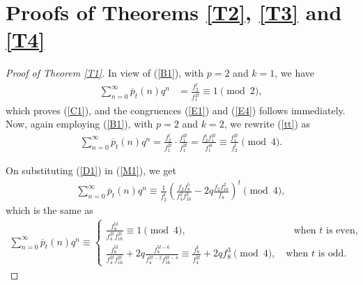 \documentclass[12pt,reqno,a4paper]{amsart}
\numberwithin{equation}{section}
\begin{document}
\section{Proofs of Theorems \ref{T2}, \ref{T3} and \ref{T4}}
\begin{proof}[Proof of Theorem \ref{T1}]
In view of (\ref{B1}), with $p=2$ and $k=1$, we have
    \begin{align*}
    \sum_{n=0}^\infty\overline{p}_{t}(n)q^n&=\frac{f_2^t}{f_1^{2t}}\equiv 1\pmod{2},
    \end{align*}
    which proves (\ref{C1}), and the congruences (\ref{E1}) and  (\ref{E4})  follows immediately. Now, again employing (\ref{B1}), with $p=2$ and $k=2$, we rewrite (\ref{tt}) as
    \begin{align}
        \label{M1}\sum_{n=0}^\infty\overline{p}_{t}(n)q^n=\frac{f_2^t}{f_1^{2t}}\cdot\frac{f_1^{2t}}{f_1^{2t}}= \frac{f_2^tf_1^{2t}}{f_1^{4t}}\equiv \frac{f_1^{2t}}{f_2^{t}}\pmod{4}.
    \end{align}
  
    On substituting (\ref{D1}) in (\ref{M1}), we get
\begin{align*}
 \sum_{n=0}^\infty\overline{p}_{t}(n)q^n\equiv \frac{1}{f_2^{t}}\left(\frac{f_2f_8^5}{f_4^2f_{16}^2}-2q\frac{f_2f_{16}^2}{f_8} \right)^t \pmod{4},
\end{align*}
 which is the same as
  \begin{align}
 \label{G4}  \sum_{n=0}^\infty\overline{p}_{t}(n)q^n\equiv \begin{cases}
        \frac{f_8^{5t}}{f_4^{2t}f_{16}^{2t}}\equiv 1 \pmod{4},\qquad\qquad\qquad\qquad\qquad\quad \text{when $t$ is even,}\\
         \frac{f_8^{5t}}{f_4^{2t}f_{16}^{2t}}+2q\frac{f_8^{5t-6}}{f_4^{2t-2}f_{16}^{2t-4}}\equiv \frac{f_8^t}{f_4^{2t}}+2qf_8^3\pmod{4},\quad \text{when $t$ is odd.}
   \end{cases}
\end{align}


\end{proof}
\end{document}

